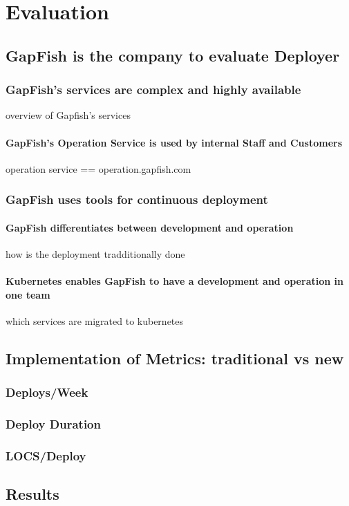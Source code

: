 \part{Evaluation}

\chapter{GapFish is the company to evaluate Deployer}
\section{GapFish's services are complex and highly available}
overview of Gapfish's services
\subsection{GapFish's Operation Service is used by internal Staff and Customers}
operation service == operation.gapfish.com
\section{GapFish uses tools for continuous deployment}
\subsection{GapFish differentiates between development and operation}
how is the deployment tradditionally done
\subsection{Kubernetes enables GapFish to have a development and operation in one team}
which services are migrated to kubernetes

\chapter{Implementation of Metrics: traditional vs new}
\section{Deploys/Week}
\section{Deploy Duration}
\section{LOCS/Deploy}

\chapter{Results}
